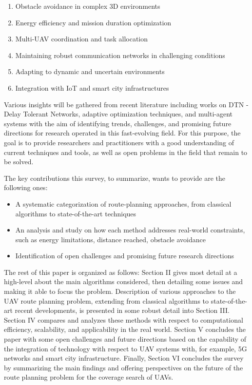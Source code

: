 \documentclass[conference]{IEEEtran}
\begin{document}
\begin{enumerate}
    \item Obstacle avoidance in complex 3D environments
    \item Energy efficiency and mission duration optimization
    \item Multi-UAV coordination and task allocation
    \item Maintaining robust communication networks in challenging conditions
    \item Adapting to dynamic and uncertain environments
    \item Integration with IoT and smart city infrastructures
\end{enumerate}

Various insights will be gathered from recent literature including works on DTN - Delay Tolerant Networks, adaptive optimization techniques, and multi-agent systems with the aim of identifying trends, challenges, and promising future directions for research operated in this fast-evolving field. For this purpose, the goal is to provide researchers and practitioners with a good understanding of current techniques and tools, as well as open problems in the field that remain to be solved. 

The key contributions this survey, to summarize, wants to provide are the following ones:

\begin{itemize}
    \item A systematic categorization of route-planning approaches, from classical algorithms to state-of-the-art techniques
    \item An analysis and study on how each method addresses real-world constraints, such as energy limitations, distance reached, obstacle avoidance
    \item Identification of open challenges and promising future research directions
\end{itemize}

The rest of this paper is organized as follows: Section II gives most detail at a high-level about the main algorithms considered, then detailing some issues and making it able to focus the problem. Description of various approaches to the UAV route planning problem, extending from classical algorithms to state-of-the-art recent developments, is presented in some robust detail into Section III. Section IV compares and analyzes these methods with respect to computational efficiency, scalability, and applicability in the real world. Section V concludes the paper with some open challenges and future directions based on the capability of the integration of technology with respect to UAV systems with, for example, 5G networks and smart city infrastructure. Finally, Section VI concludes the survey by summarizing the main findings and offering perspectives on the future of the route planning problem for the coverage search of UAVs.
\end{document}
